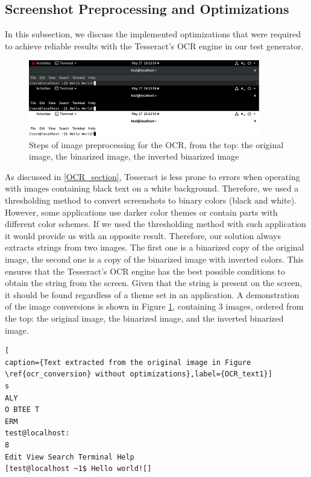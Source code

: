 \subsection{Screenshot Preprocessing and Optimizations}\label{OCR_optimizations}
In this subsection, we discuss the implemented optimizations that were required to achieve reliable results with the Tesseract's OCR engine in our test generator.

\begin{figure}[b]
	\centering
	\includegraphics[width=0.9\textwidth,clip]{obrazky-figures/OCR_conversion.png}
	\caption{Steps of image preprocessing for the OCR, from the top: the original image, the binarized image, the inverted binarized image}
	\label{ocr_conversion}
\end{figure}

As discussed in \ref{OCR_section}, Tesseract is less prone to errors when operating with images containing black text on a white background. Therefore, we used a thresholding method to convert screenshots to binary colors (black and white). However, some applications use darker color themes or contain parts with different color schemes. If we used the thresholding method with such application it would provide us with an opposite result. Therefore, our solution always extracts strings from two images. The first one is a binarized copy of the original image, the second one is a copy of the binarized image with inverted colors. This ensures that the Tesseract's OCR engine has the best possible conditions to obtain the string from the screen. Given that the string is present on the screen, it should be found regardless of a theme set in an application. A demonstration of the image conversions is shown in Figure \ref{ocr_conversion}, containing 3 images, ordered from the top: the original image, the binarized image, and the inverted binarized image. 


\begin{lstlisting}[
caption={Text extracted from the original image in Figure \ref{ocr_conversion} without optimizations},label={OCR_text1}]
s
ALY
O BTEE T
ERM
test@localhost:
8
Edit View Search Terminal Help
[test@localhost ~1$ Hello world![]
\end{lstlisting}


